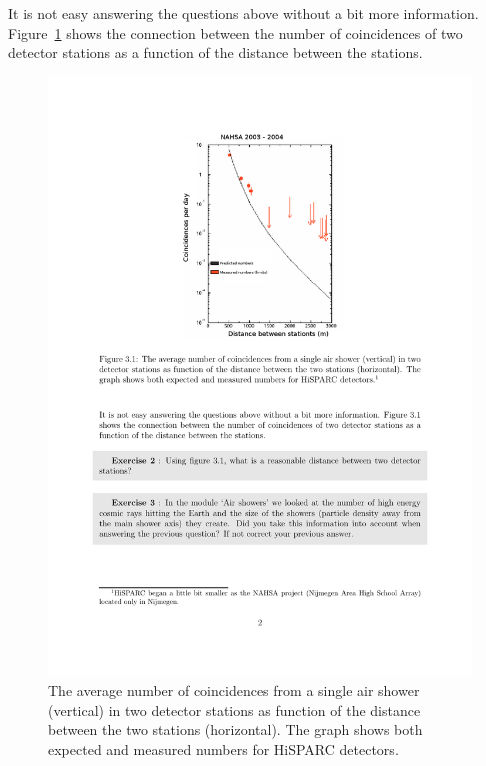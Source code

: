 \documentclass[12pt,a4paper]{article}
\numberwithin{equation}{section}
\numberwithin{figure}{section}
\numberwithin{table}{section}
\begin{document}
It is not easy answering the questions above without a bit more information. Figure~\ref{fig:dist_coin} shows the connection between the number of coincidences of two detector stations as a function of the distance between the stations.

\begin{figure}\begin{center}
\includegraphics{dist_coin}
\caption{The average number of coincidences from a single air shower (vertical) in two detector stations as function of the distance between the two stations (horizontal). The graph shows both expected and measured numbers for HiSPARC detectors.\protect\footnotemark }\label{fig:dist_coin}
\end{center}\end{figure}
\end{document}
